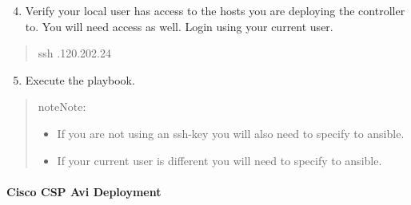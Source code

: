 \documentclass[letterpaper,10pt,english]{sphinxmanual}
\begin{document}
\begin{enumerate}
\setcounter{enumi}{3}
\item {} 
Verify your local user has access to the hosts you are deploying the controller to. You will need  access as well. Login using your current user.

\end{enumerate}
\begin{quote}

\begin{sphinxVerbatim}[commandchars=\\\{\}]
ssh .120.202.24
\end{sphinxVerbatim}
\end{quote}
\begin{enumerate}
\setcounter{enumi}{4}
\item {} 
Execute the playbook.

\end{enumerate}
\begin{quote}

\begin{sphinxadmonition}{note}{Note:}\begin{itemize}
\item {} 
If you are not using an ssh-key you will also need to specify  to ansible.

\item {} 
If your current user is different you will need to specify  to ansible.

\end{itemize}
\end{sphinxadmonition}

\begin{sphinxVerbatim}[commandchars=\\\{\}]
    
\end{sphinxVerbatim}
\end{quote}


\paragraph{Cisco CSP Avi Deployment}
\label{\detokenize{integrations/ansible/controller:cisco-csp-avi-deployment}}
\end{document}
